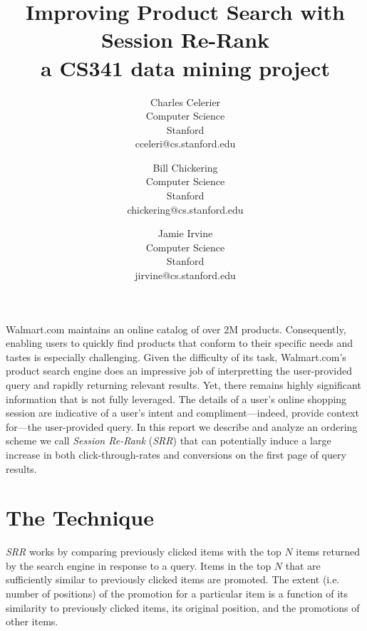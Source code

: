 \documentclass{article}
\title{Improving Product Search with Session Re-Rank \\
    \large{a CS341 data mining project}}
\author{
    Charles Celerier \\
    Computer Science \\
    Stanford \\
    cceleri@cs.stanford.edu
  \and
    Bill Chickering \\
    Computer Science \\
    Stanford \\
    chickering@cs.stanford.edu
  \and
    Jamie Irvine \\
    Computer Science \\
    Stanford \\
    jirvine@cs.stanford.edu
}
\begin{document}
\maketitle

Walmart.com maintains an online catalog of over 2M products. Consequently,
enabling users to quickly find products that conform to their specific needs and
tastes is especially challenging. Given the difficulty of its task,
Walmart.com's product search engine does an impressive job of interpretting the
user-provided query and rapidly returning relevant results. Yet, there remains
highly significant information that is not fully leveraged. The details of a
user's online shopping session are indicative of a user's intent and
compliment---indeed, provide context for---the user-provided query. In this
report we describe and analyze an ordering scheme we call {\em Session Re-Rank}
({\em SRR}) that can potentially induce a large increase in both
click-through-rates and conversions on the first page of query results.

\section{The Technique}\label{sec:technique}

{\em SRR} works by comparing previously clicked items with the top $N$ items
returned by the search engine in response to a query. Items in the top $N$ that
are sufficiently similar to previously clicked items are promoted. The extent
(i.e. number of positions) of the promotion for a particular item is a function
of its similarity to previously clicked items, its original position, and the
promotions of other items.
\end{document}
